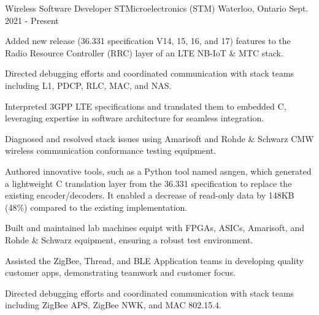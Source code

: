 
\begin{cventries}

  \cventry
    {Wireless Software Developer} %
    {STMicroelectronics (STM)} %
    {Waterloo, Ontario} %
    {Sept. 2021 - Present} %
    {
      \begin{cvitems} %
        \item {Added new release (36.331 specification V14, 15, 16, and 17) features to the Radio Resource Controller (RRC) layer of an LTE NB-IoT \& MTC stack.}
        \item {Directed debugging efforts and coordinated communication with stack teams including L1, PDCP, RLC, MAC, and NAS.}
        \item {Interpreted 3GPP LTE specifications and translated them to embedded C, leveraging expertise in software architecture for seamless integration.}
        \item {Diagnosed and resolved stack issues using Amarisoft and Rohde \& Schwarz CMW wireless communication conformance testing equipment.}
        \item {Authored innovative tools, such as a Python tool named asngen, which generated a lightweight C translation layer from the 36.331 specification to replace the existing encoder/decoders. It enabled a decrease of read-only data by 148KB (48\%) compared to the existing implementation.}
        \item {Built and maintained lab machines equipt with FPGAs, ASICs, Amarisoft, and Rohde \& Schwarz equipment, ensuring a robust test environment.}
        \item {Assisted the ZigBee, Thread, and BLE Application teams in developing quality customer apps, demonstrating teamwork and customer focus.}
        \item {Directed debugging efforts and coordinated communication with stack teams including ZigBee APS, ZigBee NWK, and MAC 802.15.4.}
      \end{cvitems}
    }


\end{cventries}
